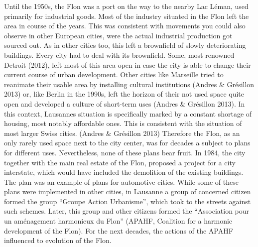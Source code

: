 \documentclass[a4paper,
fontsize=11pt,
oneside,
numbers=noperiodatend,
parskip=half-,
bibliography=totoc,
final
]{scrartcl}
\begin{document}
Until the 1950s, the Flon was a port on the way to the nearby Lac Léman,
used primarily for industrial goods. Most of the industry situated in
the Flon left the area in course of the years. This was consistent with
movements you could also observe in other European cities, were the
actual industrial production got sourced out. As in other cities too,
this left a brownfield of slowly deteriorating buildings. Every city had
to deal with its brownfield. Some, most renowned Detroit (2012), left
most of this area open in case the city is able to change their current
course of urban development. Other cities like Marseille tried to
reanimate their usable area by installing cultural institutions (Andres
\& Grésillon 2013) or, like Berlin in the 1990s, left the horizon of
their not used space quite open and developed a culture of short-term
uses (Andres \& Grésillon 2013). In this context, Lausannes situation is
specifically marked by a constant shortage of housing, most notably
affordable ones. This is consistent with the situation of most larger
Swiss cities. (Andres \& Grésillon 2013) Therefore the Flon, as an only
rarely used space next to the city center, was for decades a subject to
plans for different uses. Nevertheless, none of these plans bear fruit.
In 1984, the city together with the main real estate of the Flon,
proposed a project for a city interstate, which would have included the
demolition of the existing buildings. The plan was an example of plans
for automotive cities. While some of these plans were implemented in
other cities, in Lausanne a group of concerned citizen formed the group
\enquote{Groupe Action Urbanisme}, which took to the streets against
such schemes. Later, this group and other citizens formed the
\enquote{Association pour un aménagement harmonieux du Flon} (APAHF,
Coalition for a harmonic development of the Flon). For the next decades,
the actions of the APAHF influenced to evolution of the Flon.
\end{document}
